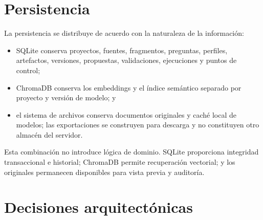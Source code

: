\section{Persistencia}

La persistencia se distribuye de acuerdo con la naturaleza de la información:

\begin{itemize}
  \item SQLite conserva proyectos, fuentes, fragmentos, preguntas, perfiles, artefactos, versiones, propuestas, validaciones, ejecuciones y puntos de control;
  \item ChromaDB conserva los embeddings y el índice semántico separado por proyecto y versión de modelo; y
  \item el sistema de archivos conserva documentos originales y caché local de modelos; las exportaciones se construyen para descarga y no constituyen otro almacén del servidor.
\end{itemize}

Esta combinación no introduce lógica de dominio. SQLite proporciona integridad transaccional e historial; ChromaDB permite recuperación vectorial; y los originales permanecen disponibles para vista previa y auditoría.

\section{Decisiones arquitectónicas}

